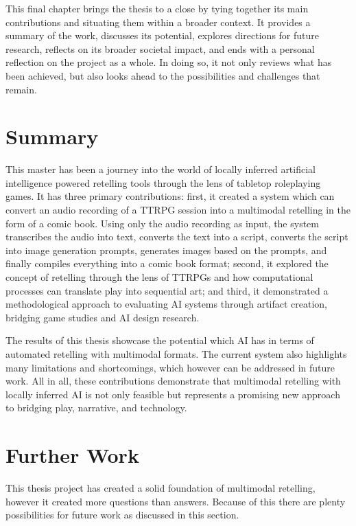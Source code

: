 This final chapter brings the thesis to a close by tying together its main contributions and situating them within a broader context. It provides a summary of the work, discusses its potential, explores directions for future research, reflects on its broader societal impact, and ends with a personal reflection on the project as a whole. In doing so, it not only reviews what has been achieved, but also looks ahead to the possibilities and challenges that remain.

\section{Summary}
This master has been a journey into the world of locally inferred artificial intelligence powered retelling tools through the lens of tabletop roleplaying games. It has three primary contributions: first, it created a system which can convert an audio recording of a TTRPG session into a multimodal retelling in the form of a comic book. Using only the audio recording as input, the system transcribes the audio into text, converts the text into a script, converts the script into image generation prompts, generates images based on the prompts, and finally compiles everything into a comic book format; second, it explored the concept of retelling through the lens of TTRPGs and how computational processes can translate play into sequential art; and third, it demonstrated a methodological approach to evaluating AI systems through artifact creation, bridging game studies and AI design research.

The results of this thesis showcase the potential which AI has in terms of automated retelling with multimodal formats. The current system also highlights many limitations and shortcomings, which however can be addressed in future work. All in all, these contributions demonstrate that multimodal retelling with locally inferred AI is not only feasible but represents a promising new approach to bridging play, narrative, and technology.

\section{Further Work}
This thesis project has created a solid foundation of multimodal retelling, however it created more questions than answers. Because of this there are plenty possibilities for future work as discussed in this section.

